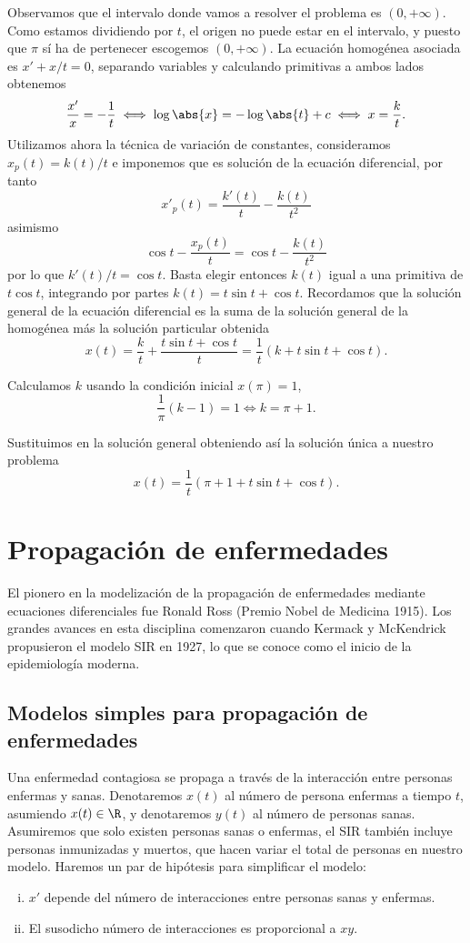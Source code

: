\documentclass[../ecuaciones_diferenciales.tex]{subfiles}
\begin{document}
\begin{solution}
	Observamos que el intervalo donde vamos a resolver el problema es
	\((0, +\infty)\). Como estamos dividiendo por \(t\), el origen no puede
	estar en el intervalo, y puesto que \(\pi\) sí ha de pertenecer escogemos
	\((0, +\infty)\). La ecuación homogénea asociada es \(x' + x/t = 0\),
	separando variables y calculando primitivas a ambos lados obtenemos
	\[\frac{x'}{x} = -\frac{1}{t} \iff \log\abs{x}
		= -\log\abs{t} + c \iff x = \frac{k}{t}.\]
	Utilizamos ahora la técnica de variación de constantes, consideramos
	\(x_p(t) = k(t)/t\) e imponemos que es solución de la ecuación diferencial,
	por tanto
	\[x'_p(t) = \frac{k'(t)}{t} - \frac{k(t)}{t^2}\]
	asimismo
	\[\cos t - \frac{x_p(t)}{t} = \cos t - \frac{k(t)}{t^2}\]
	por lo que \(k'(t)/t = \cos t\). Basta elegir entonces \(k(t)\) igual a una
	primitiva de \(t \cos t\), integrando por partes
	\(k(t) = t \sin t + \cos t\). Recordamos que la solución general de la
	ecuación diferencial es la suma de la solución general de la homogénea más
	la solución particular obtenida
	\[x(t) = \frac{k}{t} + \frac{t \sin t + \cos t}{t}
		= \frac{1}{t}(k + t \sin t + \cos t).\]

	Calculamos \(k\) usando la condición inicial \(x(\pi) = 1\),
	\[\frac{1}{\pi}(k - 1) = 1 \iff k = \pi + 1.\]

	Sustituimos en la solución general obteniendo así la solución única a
	nuestro problema
	\[x(t) = \frac{1}{t}(\pi + 1 + t \sin t + \cos t).\]
\end{solution}

\section{Propagación de enfermedades}

El pionero en la modelización de la propagación de enfermedades mediante
ecuaciones diferenciales fue Ronald Ross (Premio Nobel de Medicina 1915). Los
grandes avances en esta disciplina comenzaron cuando Kermack y McKendrick
propusieron el modelo SIR en 1927, lo que se conoce como el inicio de la
epidemiología moderna.

\subsection{Modelos simples para propagación de enfermedades}

Una enfermedad contagiosa se propaga a través de la interacción entre personas
enfermas y sanas. Denotaremos \(x(t)\) al número de persona enfermas a tiempo
\(t\), asumiendo \(x(t) \in \R\), y denotaremos \(y(t)\) al número de personas
sanas. Asumiremos que solo existen personas sanas o enfermas, el SIR también
incluye personas inmunizadas y muertos, que hacen variar el total de personas en
nuestro modelo. Haremos un par de hipótesis para simplificar el modelo:
\begin{enumerate}[i)]
	\item \(x'\) depende del número de interacciones entre personas sanas y
	      enfermas.

	\item El susodicho número de interacciones es proporcional a \(xy\).
\end{enumerate}
\end{document}
